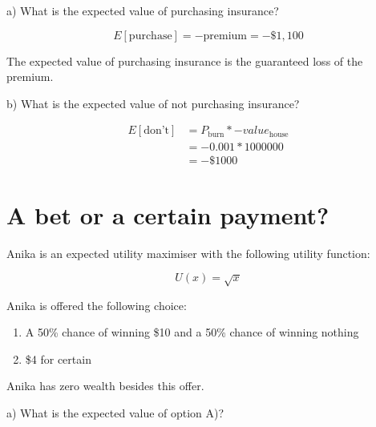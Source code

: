 \documentclass[
  letterpaper,
  DIV=11,
  numbers=noendperiod]{scrreprt}
\providecommand{\tightlist}{%
  \setlength{\itemsep}{0pt}\setlength{\parskip}{0pt}}\usepackage{longtable,booktabs,array}
\begin{document}
\begin{tcolorbox}[enhanced jigsaw, title=\textcolor{quarto-callout-tip-color}{\faLightbulb}\hspace{0.5em}{Answer}, toprule=.15mm, colback=white, breakable, titlerule=0mm, colframe=quarto-callout-tip-color-frame, coltitle=black, opacityback=0, rightrule=.15mm, colbacktitle=quarto-callout-tip-color!10!white, bottomtitle=1mm, opacitybacktitle=0.6, arc=.35mm, bottomrule=.15mm, toptitle=1mm, leftrule=.75mm, left=2mm]

a) What is the expected value of purchasing insurance?

\[
E[\text{purchase}]=-\text{premium}=-\$1,100
\]

The expected value of purchasing insurance is the guaranteed loss of the
premium.

b) What is the expected value of not purchasing insurance?

\begin{align*}
E[\text{don't}]&=P_{\text{burn}}*-value_{\text{house}} \\
&=-0.001*1000000 \\
&=-\$1000
\end{align*}

\end{tcolorbox}

\hypertarget{a-bet-or-a-certain-payment}{%
\section{A bet or a certain payment?}\label{a-bet-or-a-certain-payment}}

Anika is an expected utility maximiser with the following utility
function:

\[U(x)=\sqrt{x}\]

Anika is offered the following choice:

\begin{enumerate}
\def\labelenumi{\Alph{enumi})}
\tightlist
\item
  A 50\% chance of winning \$10 and a 50\% chance of winning nothing
\item
  \$4 for certain
\end{enumerate}

Anika has zero wealth besides this offer.

a) What is the expected value of option A)?
\end{document}

